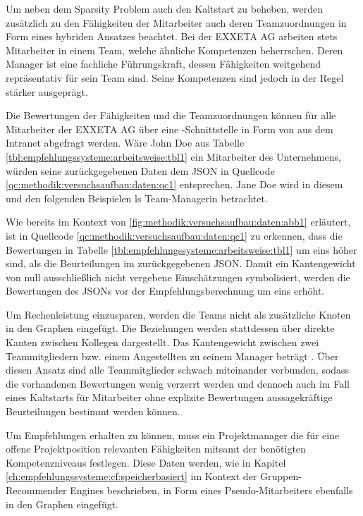 Um neben dem Sparsity Problem auch den Kaltstart zu beheben, werden zusätzlich zu den Fähigkeiten der Mitarbeiter auch deren Teamzuordnungen in Form eines hybriden Ansatzes beachtet. Bei der EXXETA AG arbeiten stets Mitarbeiter in einem Team, welche ähnliche Kompetenzen beherrschen. Deren Manager ist eine fachliche Führungskraft, dessen Fähigkeiten weitgehend repräsentativ für sein Team sind. Seine Kompetenzen sind jedoch in der Regel stärker ausgeprägt.

Die Bewertungen der Fähigkeiten und die Teamzuordnungen können für alle Mitarbeiter der EXXETA AG über eine -Schnittstelle in Form von  aus dem Intranet abgefragt werden. Wäre John Doe aus Tabelle \ref{tbl:empfehlungssysteme:arbeitsweise:tbl1} ein Mitarbeiter des Unternehmens, würden seine zurückgegebenen Daten dem \ac{JSON} in Quellcode \ref{qc:methodik:versuchsaufbau:daten:qc1} entsprechen. Jane Doe wird in diesem und den folgenden Beispielen ls Team-Managerin betrachtet.



Wie bereits im Kontext von \ref{fig:methodik:versuchsaufbau:daten:abb1} erläutert, ist in Quellcode \ref{qc:methodik:versuchsaufbau:daten:qc1} zu erkennen, dass die Bewertungen in Tabelle \ref{tbl:empfehlungssysteme:arbeitsweise:tbl1} um eins höher sind, als die Beurteilungen im zurückgegebenen \ac{JSON}. Damit ein Kantengewicht von null ausschließlich nicht vergebene Einschätzungen symbolisiert, werden die Bewertungen des \acp{JSON} vor der Empfehlungsberechnung um eins erhöht.

Um Rechenleistung einzusparen, werden die Teams nicht als zusätzliche Knoten in den Graphen eingefügt. Die Beziehungen werden stattdessen über direkte Kanten zwischen Kollegen dargestellt. Das Kantengewicht zwischen zwei Teammitgliedern bzw. einem Angestellten zu seinem Manager beträgt \kantengewicht. Über diesen Ansatz sind alle Teammitglieder schwach miteinander verbunden, sodass die vorhandenen Bewertungen wenig verzerrt werden und dennoch auch im Fall eines Kaltstarts für Mitarbeiter ohne explizite Bewertungen aussagekräftige Beurteilungen bestimmt werden können.

Um Empfehlungen erhalten zu können, muss ein Projektmanager die für eine offene Projektposition relevanten Fähigkeiten mitsamt der benötigten Kompetenzniveaus festlegen. Diese Daten werden, wie in Kapitel \ref{ch:empfehlungssysteme:cf:speicherbasiert} im Kontext der Gruppen-Recommender Engines beschrieben, in Form eines Pseudo-Mitarbeiters ebenfalls in den Graphen eingefügt.

